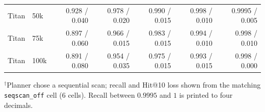 \begin{table}[t]
{\begin{tabular}{@{}llrrrrr@{}}
Titan & 50k & 0.928 / 0.040 & 0.978 / 0.020 & 0.990 / 0.015 & 0.998 / 0.010 & 0.9995 / 0.005 \\
Titan & 75k & 0.897 / 0.060 & 0.966 / 0.015 & 0.983 / 0.015 & 0.994 / 0.010 & 0.998 / 0.010 \\
Titan & 100k & 0.891 / 0.080 & 0.954 / 0.035 & 0.975 / 0.015 & 0.993 / 0.015 & 0.998 / 0.000 \\
\bottomrule
\end{tabular}}
\par\smallskip\footnotesize{$^{\dagger}$Planner chose a sequential scan; recall and Hit@10 loss shown from the matching \texttt{seqscan\_off} cell (6 cells). Recall between $0.9995$ and $1$ is printed to four decimals.}
\end{table}
